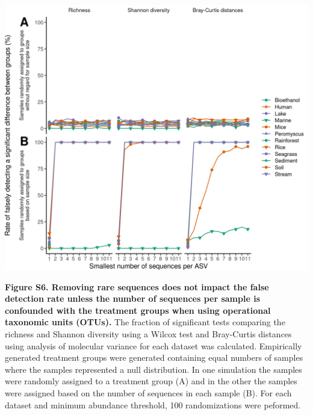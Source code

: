 \documentclass[
]{article}
\begin{document}
\includegraphics{figure_s6.png}

\textbf{Figure S6. Removing rare sequences does not impact the false
detection rate unless the number of sequences per sample is confounded
with the treatment groups when using operational taxonomic units
(OTUs).} The fraction of significant tests comparing the richness and
Shannon diversity using a Wilcox test and Bray-Curtis distances using
analysis of molecular variance for each dataset was calculated.
Empirically generated treatment groups were generated containing equal
numbers of samples where the samples represented a null distribution. In
one simulation the samples were randomly assigned to a treatment group
(A) and in the other the samples were assigned based on the number of
sequences in each sample (B). For each dataset and minimum abundance
threshold, 100 randomizations were peformed.
\end{document}
